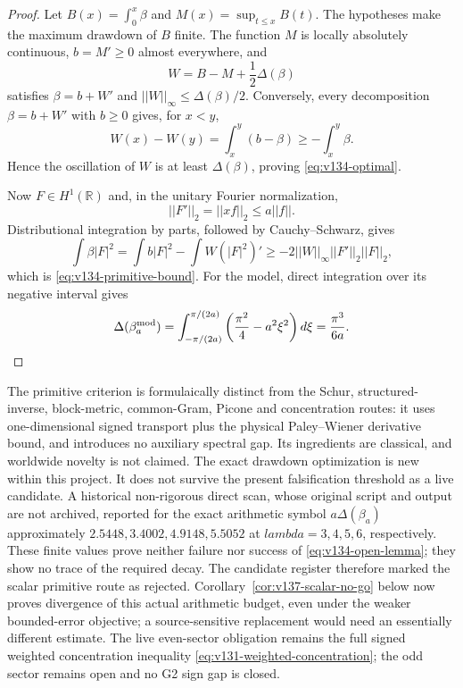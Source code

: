 \documentclass[11pt]{article}
\def\lambda{lambda}%
\def\norm#1{||#1||}%
\theoremstyle{remark}
\newcommand{\norm}[1]{\left\lVert #1\right\rVert}
\begin{document}
\begin{proof}
Let $B(x)=\int_0^x\beta$ and
$M(x)=\sup_{t\le x}B(t)$.  The hypotheses make the maximum drawdown of
$B$ finite.  The function $M$ is locally absolutely continuous,
$b=M'\ge0$ almost everywhere, and
\[
 W=B-M+\frac12\Delta(\beta)
\]
satisfies $\beta=b+W'$ and
$\norm W_\infty\le\Delta(\beta)/2$.  Conversely, every decomposition
$\beta=b+W'$ with $b\ge0$ gives, for $x<y$,
\[
 W(x)-W(y)=\int_x^y(b-\beta)
 \ge-\int_x^y\beta.
\]
Hence the oscillation of $W$ is at least $\Delta(\beta)$, proving
\eqref{eq:v134-optimal}.

Now $F\in H^1(\mathbb R)$ and, in the unitary Fourier normalization,
\[
 \norm{F'}_2=\norm{xf}_2\le a\norm f.
\]
Distributional integration by parts, followed by Cauchy--Schwarz,
gives
\[
 \int\beta|F|^2
 =\int b|F|^2-\int W(|F|^2)'
 \ge-2\norm W_\infty\norm{F'}_2\norm F_2,
\]
which is \eqref{eq:v134-primitive-bound}.  For the model, direct
integration over its negative interval gives
\[
 \Delta(\beta_a^{\rm mod})
 =\int_{-\pi/(2a)}^{\pi/(2a)}
   \left(\frac{\pi^2}{4}-a^2\xi^2\right)d\xi
 =\frac{\pi^3}{6a}.
\]
\end{proof}

The primitive criterion is formulaically distinct from the Schur,
structured-inverse, block-metric, common-Gram, Picone and concentration
routes: it uses one-dimensional signed transport plus the physical
Paley--Wiener derivative bound, and introduces no auxiliary spectral
gap.  Its ingredients are classical, and worldwide novelty is not
claimed.  The exact drawdown optimization is new within this project.
It does not survive the present falsification threshold as a live
candidate. A historical non-rigorous direct scan, whose original script
and output are not archived, reported for the exact arithmetic symbol $a\Delta(\beta_a)$ approximately $2.5448,3.4002,4.9148,5.5052$
at $\lambda=3,4,5,6$, respectively.  These finite values prove neither
failure nor success of \eqref{eq:v134-open-lemma}; they show no trace of
the required decay.  The candidate register therefore marked the scalar
primitive route as rejected. Corollary~\ref{cor:v137-scalar-no-go}
below now proves divergence of this actual arithmetic budget, even
under the weaker bounded-error objective; a source-sensitive replacement
would need an essentially different estimate.  The live even-sector obligation remains the full
signed weighted concentration inequality
\eqref{eq:v131-weighted-concentration}; the odd sector remains open and
no G2 sign gap is closed.
\end{document}
